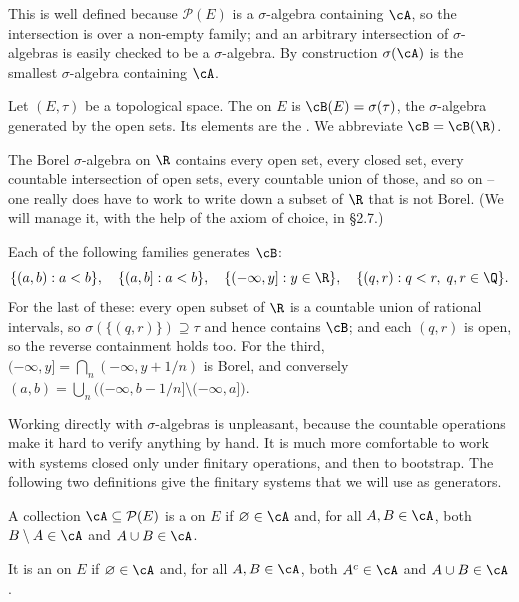 This is well defined because $\mathcal{P}(E)$ is a $\sigma$-algebra containing $\cA$, so the intersection is over a non-empty family; and an arbitrary intersection of $\sigma$-algebras is easily checked to be a $\sigma$-algebra. By construction $\sigma(\cA)$ is the smallest $\sigma$-algebra containing $\cA$.

\begin{definition}
	Let $(E, \tau)$ be a topological space. The  on $E$ is $\cB(E) = \sigma(\tau)$, the $\sigma$-algebra generated by the open sets. Its elements are the . We abbreviate $\cB = \cB(\R)$.
\end{definition}

The Borel $\sigma$-algebra on $\R$ contains every open set, every closed set, every countable intersection of open sets, every countable union of those, and so on -- one really does have to work to write down a subset of $\R$ that is not Borel. (We will manage it, with the help of the axiom of choice, in \S2.7.)

\begin{example}[Generators of $\cB$]
	Each of the following families generates $\cB$:
	$$
	\{ (a,b) : a<b \}, \quad \{ (a, b] : a < b \}, \quad \{ (-\infty, y] : y \in \R \}, \quad \{ (q, r) : q < r,\; q,r \in \Q \}.
	$$
	For the last of these: every open subset of $\R$ is a countable union of rational intervals, so $\sigma(\{(q,r)\}) \supseteq \tau$ and hence contains $\cB$; and each $(q,r)$ is open, so the reverse containment holds too. For the third, $(-\infty, y] = \bigcap_n (-\infty, y + 1/n)$ is Borel, and conversely $(a,b) = \bigcup_n \big( (-\infty, b - 1/n] \setminus (-\infty, a] \big)$.
\end{example}

Working directly with $\sigma$-algebras is unpleasant, because the countable operations make it hard to verify anything by hand. It is much more comfortable to work with systems closed only under finitary operations, and then to bootstrap. The following two definitions give the finitary systems that we will use as generators.

\begin{definition}
	A collection $\cA \subseteq \mathcal{P}(E)$ is a  on $E$ if $\varnothing \in \cA$ and, for all $A, B \in \cA$, both $B \setminus A \in \cA$ and $A \cup B \in \cA$.

	It is an  on $E$ if $\varnothing \in \cA$ and, for all $A, B \in \cA$, both $A^c \in \cA$ and $A \cup B \in \cA$.
\end{definition}

